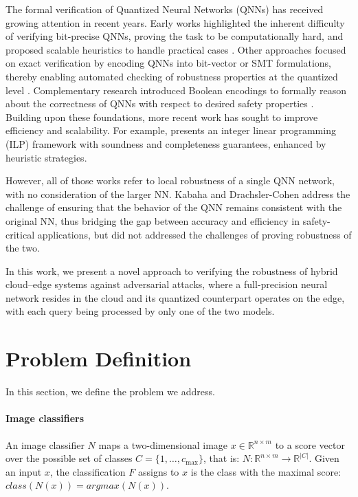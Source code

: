 \documentclass[11pt]{article}
\begin{document}
The formal verification of Quantized Neural Networks (QNNs) has received growing attention in recent years. Early works highlighted the inherent difficulty of verifying bit-precise QNNs, proving the task to be computationally hard, and proposed scalable heuristics to handle practical cases \cite{henzinger2021scalable}. Other approaches focused on exact verification by encoding QNNs into bit-vector or SMT formulations, thereby enabling automated checking of robustness properties at the quantized level \cite{sena2021smt, sena2021verifying}. Complementary research introduced Boolean encodings to formally reason about the correctness of QNNs with respect to desired safety properties \cite{kovasznai2023formal}.  
Building upon these foundations, more recent work has sought to improve efficiency and scalability. For example, \cite{huang2023towards} presents an integer linear programming (ILP) framework with soundness and completeness guarantees, enhanced by heuristic strategies. 

However, all of those works refer to local robustness of a single QNN network, with no consideration of the larger NN.
Kabaha and Drachsler-Cohen \cite{kabaha2025quantization} address the challenge of ensuring that the behavior of the QNN remains consistent with the original NN, thus bridging the gap between accuracy and efficiency in safety-critical applications, but did not addressed the challenges of proving robustness of the two.

In this work, we present a novel approach to verifying the robustness of hybrid cloud–edge systems against adversarial attacks, where a full-precision neural network resides in the cloud and its quantized counterpart operates on the edge, with each query being processed by only one of the two models.






\section{Problem Definition}
In this section, we define the problem we address.

\paragraph{Image classifiers}
An image classifier $N$ maps a two-dimensional image $x\in \mathbb{R}^{n \times m}$ to a score vector over the possible set of classes $C=\{1,\ldots,c_\text{max}\}$, that is:
$N: \mathbb{R}^{n \times m} \rightarrow {\mathbb{R}}^{|C|}$.
Given an input $x$, the classification $F$ assigns to $x$ is the class with the maximal score: $class(N(x))=argmax(N(x))$.
\end{document}
